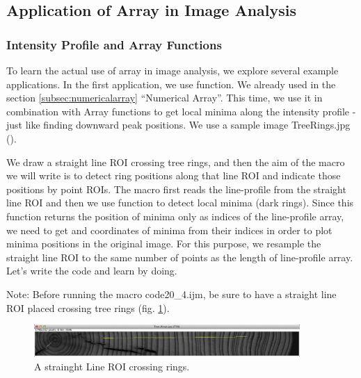 \subsection{Application of Array in Image Analysis}
\subsubsection{Intensity Profile and Array Functions}

To learn the actual use of array in image analysis, we explore several example applications. In the first application, we use  function. We already used  in the section \ref{subsec:numericalarray} ``Numerical Array''. This time, we use it in combination with Array functions to get local minima along the intensity profile - just like finding downward peak positions. We use a sample image Tree\textunderscore Rings.jpg (). 
 
We draw a straight line ROI crossing tree rings, and then the aim of the macro we will write is to detect ring positions along that line ROI and indicate those positions by point ROIs. The macro first reads the line-profile from the straight line ROI and then we use  function to detect local minima (dark rings). Since this function returns the position of minima only as indices of the line-profile array, we need to get  and  coordinates of minima from their indices in order to plot minima positions in the original image. For this purpose, we resample the straight line ROI to the same number of points as the length of line-profile array. Let's write the code and learn by doing. 

Note: Before running the macro code20\_4.ijm, be sure to have a straight line ROI placed crossing tree rings (fig. \ref{fig:treeRingsSelected}). 

\begin{figure}[h!]
\begin{center}
\includegraphics[width=0.9\textwidth]{fig/Tree_Rings_Selected.png}
\caption{A strainght Line ROI crossing rings.}
\label{fig:treeRingsSelected}
\end{center}
\end{figure}





